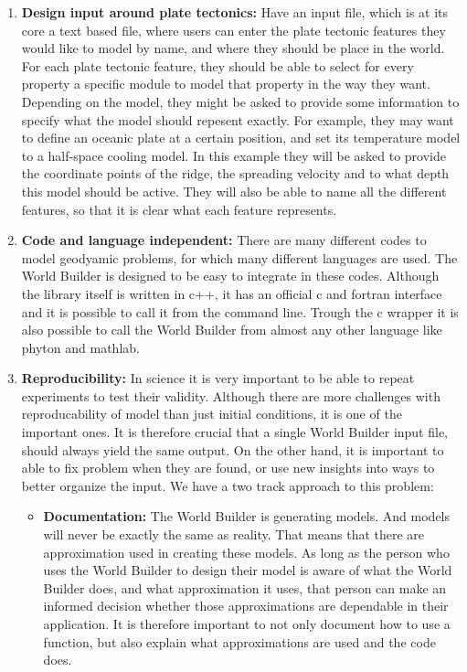 \documentclass{book}
\newcommand{\WB}{{World Builder}}
\begin{document}
\begin{enumerate}
    \item {\bf Design input around plate tectonics:} Have an input file, which is at its core a text based file, where users can enter the plate tectonic features they would like to model by name, and where they should be place in the world. For each plate tectonic feature, they should be able to select for every property a specific module to model that property in the way they want. Depending on the model, they might be asked to provide some information to specify what the model should repesent exactly. For example, they may want to define an oceanic plate at a certain position, and set its temperature model to a half-space cooling model. In this example they will be asked to provide the coordinate points of the ridge, the spreading velocity and to what depth this model should be active. They will also be able to name all the different features, so that it is clear what each feature represents.
    \item {\bf Code and language independent:} There are many different codes to model geodyamic problems, for which many different languages are used. The \WB{} is designed to be easy to integrate in these codes. Although the library itself is written in c++, it has an official c and fortran interface and it is possible to call it from the command line. Trough the c wrapper it is also possible to call the \WB{} from almost any other language like phyton and mathlab. 
    \item {\bf Reproducibility: } In science it is very important to be able to repeat experiments to test their validity. Although there are more challenges with reproducability of model than just initial conditions, it is one of the important ones. It is therefore crucial that a single \WB{} input file, should always yield the same output. On the other hand, it is important to able to fix problem when they are found, or use new insights into ways to better organize the input. We have a two track approach to this problem:
    \begin{itemize}
        \item {\bf Documentation: } The \WB{} is generating models. And models will never be exactly the same as reality. That means that there are approximation used in creating these models. As long as the person who uses the \WB{} to design their model is aware of what the \WB{} does, and what approximation it uses, that person can make an informed decision whether those approximations are dependable in their application. It is therefore important to not only document how to use a function, but also explain what approximations are used and the code does. 

\end{itemize}
\end{enumerate}
\end{document}
